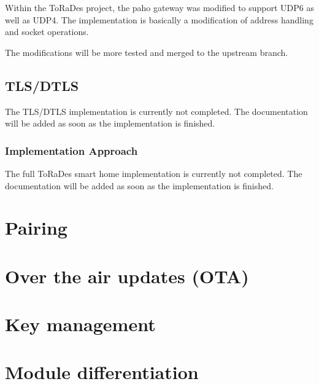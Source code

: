 \documentclass[]{scrreprt}%
\begin{document}
Within the ToRaDes project, the paho gateway was modified to support UDP6 as well as UDP4.
The implementation is basically a modification of address handling and socket operations.

The modifications will be more tested and merged to the upstream branch.

\subsection{TLS/DTLS}

The TLS/DTLS implementation is currently not completed. The documentation will be added as soon as the implementation is finished.


\subsubsection{Implementation Approach}

The full ToRaDes smart home implementation is currently not completed. The documentation will be added as soon as the implementation is finished.



\section{Pairing}


\section{Over the air updates (OTA)}


\section{Key management}


\section{Module differentiation}

\end{document}
